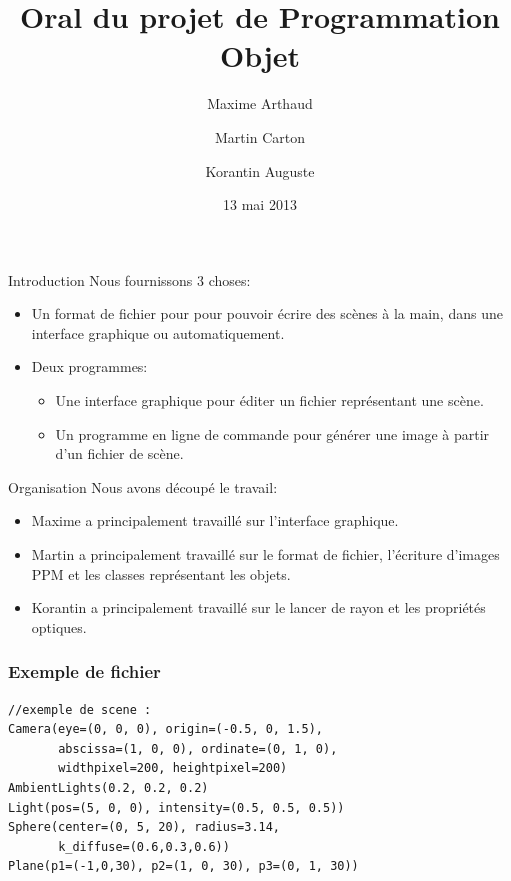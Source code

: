 \documentclass{beamer}
\title{Oral du projet de Programmation Objet}
\author{Maxime Arthaud \and Martin Carton \and Korantin Auguste}
\date{13 mai 2013}
\begin{document}
  \begin{frame}
    \titlepage
  \end{frame}

  \begin{frame}{Introduction}
    Nous fournissons 3 choses:
    \begin{itemize}
      \item Un format de fichier pour pour pouvoir écrire des scènes à la main,
        dans une interface graphique ou automatiquement.

      \item
        Deux programmes:
        \begin{itemize}
          \item Une interface graphique pour éditer un fichier représentant une
            scène.
          \item Un programme en ligne de commande pour générer une image à
            partir d'un fichier de scène.
        \end{itemize}
    \end{itemize}
  \end{frame}

  \begin{frame}{Organisation}
    Nous avons découpé le travail:
    \begin{itemize}
      \item Maxime a principalement travaillé sur l'interface graphique.
      \item Martin a principalement travaillé sur le format de fichier,
        l'écriture d'images PPM et les classes représentant les objets.
      \item Korantin a principalement travaillé sur le lancer de rayon et les
        propriétés optiques.
    \end{itemize}
  \end{frame}

\begin{frame}[fragile]
\frametitle{Exemple de fichier}

\begin{lstlisting}
//exemple de scene :
Camera(eye=(0, 0, 0), origin=(-0.5, 0, 1.5),
       abscissa=(1, 0, 0), ordinate=(0, 1, 0),
       widthpixel=200, heightpixel=200)
AmbientLights(0.2, 0.2, 0.2)
Light(pos=(5, 0, 0), intensity=(0.5, 0.5, 0.5))
Sphere(center=(0, 5, 20), radius=3.14,
       k_diffuse=(0.6,0.3,0.6))
Plane(p1=(-1,0,30), p2=(1, 0, 30), p3=(0, 1, 30))
\end{lstlisting}
\end{frame}
\end{document}
